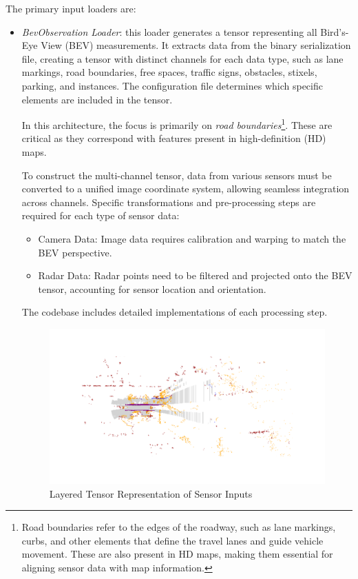 The primary input loaders are:
\begin{itemize}
    \item \textit{BevObservation Loader}: this loader generates a tensor representing all Bird's-Eye View (BEV) measurements. It extracts data from the binary serialization file, creating a tensor with distinct channels for each data type, such as lane markings, road boundaries, free spaces, traffic signs, obstacles, stixels, parking, and instances. The configuration file determines which specific elements are included in the tensor.

    In this architecture, the focus is primarily on \textit{road boundaries}\footnote{Road boundaries refer to the edges of the roadway, such as lane markings, curbs, and other elements that define the travel lanes and guide vehicle movement. These are also present in HD maps, making them essential for aligning sensor data with map information.}. These are critical as they correspond with features present in high-definition (HD) maps.

    To construct the multi-channel tensor, data from various sensors must be converted to a unified image coordinate system, allowing seamless integration across channels. Specific transformations and pre-processing steps are required for each type of sensor data:
    \begin{itemize}
        \item Camera Data: Image data requires calibration and warping to match the BEV perspective.
        \item Radar Data: Radar points need to be filtered and projected onto the BEV tensor, accounting for sensor location and orientation.
    \end{itemize}
    
    The codebase includes detailed implementations of each processing step. 
    \begin{figure}[H]
        \centering
        \includegraphics[width=0.85\linewidth]{LateX//figs/bevLoader.pdf}
        \caption{Layered Tensor Representation of Sensor Inputs}
        \label{fig:bev-loader}
    \end{figure}


\end{itemize}
